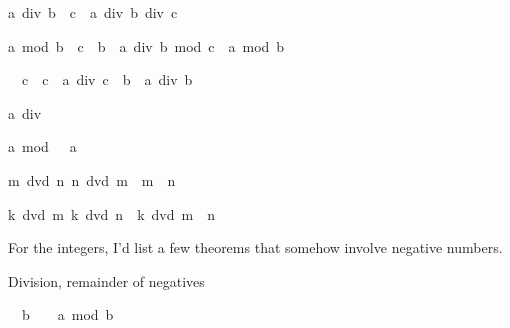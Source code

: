 \begin{isabellebody}
\begin{isamarkuptext}
\begin{isabelle}%
a\ div\ {\isacharparenleft}b\ {\isacharasterisk}\ c{\isacharparenright}\ {\isacharequal}\ a\ div\ b\ div\ c%
\end{isabelle}

\begin{isabelle}%
a\ mod\ {\isacharparenleft}b\ {\isacharasterisk}\ c{\isacharparenright}\ {\isacharequal}\ b\ {\isacharasterisk}\ {\isacharparenleft}a\ div\ b\ mod\ c{\isacharparenright}\ {\isacharplus}\ a\ mod\ b%
\end{isabelle}

\begin{isabelle}%
{}\ {\isacharless}\ c\ {\isasymLongrightarrow}\ c\ {\isacharasterisk}\ a\ div\ {\isacharparenleft}c\ {\isacharasterisk}\ b{\isacharparenright}\ {\isacharequal}\ a\ div\ b%
\end{isabelle}

\begin{isabelle}%
a\ div\ {}\ {\isacharequal}\ {}%
\end{isabelle}

\begin{isabelle}%
a\ mod\ {}\ {\isacharequal}\ a%
\end{isabelle}

\begin{isabelle}%
{\isasymlbrakk}m\ dvd\ n{\isacharsemicolon}\ n\ dvd\ m{\isasymrbrakk}\ {\isasymLongrightarrow}\ m\ {\isacharequal}\ n%
\end{isabelle}

\begin{isabelle}%
{\isasymlbrakk}k\ dvd\ m{\isacharsemicolon}\ k\ dvd\ n{\isasymrbrakk}\ {\isasymLongrightarrow}\ k\ dvd\ m\ {\isacharplus}\ n%
\end{isabelle}

For the integers, I'd list a few theorems that somehow involve negative 
numbers.  

Division, remainder of negatives


\begin{isabelle}%
{\isacharhash}{}\ {\isacharless}\ b\ {\isasymLongrightarrow}\ {\isacharhash}{}\ {\isasymle}\ a\ mod\ b%
\end{isabelle}


\end{isamarkuptext}
\end{isabellebody}
